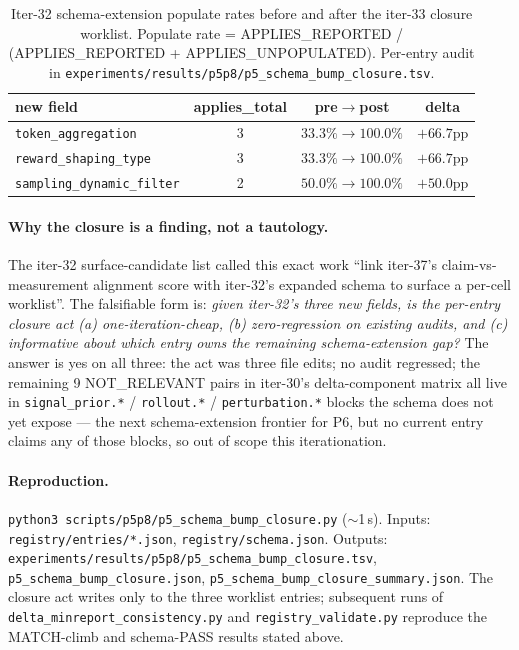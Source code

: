 \begin{table}[t]
\centering
\small
\caption{Iter-32 schema-extension populate rates before and after the
iter-33 closure worklist. Populate rate = APPLIES\_REPORTED /
(APPLIES\_REPORTED + APPLIES\_UNPOPULATED).
Per-entry audit in
\texttt{experiments/results/p5p8/p5\_schema\_bump\_closure.tsv}.}
\label{tab:p5-schema-bump}
\begin{tabular}{lccc}
\toprule
new field & applies\_total & pre$\rightarrow$post & delta \\
\midrule
\texttt{token\_aggregation}        & 3 & $33.3\%\rightarrow\mathbf{100.0\%}$ & $+66.7$pp \\
\texttt{reward\_shaping\_type}      & 3 & $33.3\%\rightarrow\mathbf{100.0\%}$ & $+66.7$pp \\
\texttt{sampling\_dynamic\_filter}  & 2 & $50.0\%\rightarrow\mathbf{100.0\%}$ & $+50.0$pp \\
\bottomrule
\end{tabular}
\end{table}

\paragraph{Why the closure is a finding, not a tautology.}
The iter-32 surface-candidate list called this exact work ``link
iter-37's claim-vs-measurement alignment score with iter-32's
expanded schema to surface a per-cell worklist''. The falsifiable
form is: \emph{given iter-32's three new fields, is the per-entry
closure act (a) one-iteration-cheap, (b) zero-regression on
existing audits, and (c) informative about which entry owns the
remaining schema-extension gap?} The answer is yes on all three:
the act was three file edits; no audit regressed; the remaining
9 NOT\_RELEVANT pairs in iter-30's delta-component matrix all live
in \texttt{signal\_prior.*} / \texttt{rollout.*} /
\texttt{perturbation.*} blocks the schema does not yet expose ---
the next schema-extension frontier for P6, but no current entry
claims any of those blocks, so out of scope this iterationation.

\paragraph{Reproduction.}
\texttt{python3 scripts/p5p8/p5\_schema\_bump\_closure.py}
($\sim$1\,s). Inputs: \texttt{registry/entries/*.json},
\texttt{registry/schema.json}. Outputs:
\texttt{experiments/results/p5p8/p5\_schema\_bump\_closure.tsv},
\texttt{p5\_schema\_bump\_closure.json},
\texttt{p5\_schema\_bump\_closure\_summary.json}. The closure act
writes only to the three worklist entries; subsequent runs of
\texttt{delta\_minreport\_consistency.py} and
\texttt{registry\_validate.py} reproduce the MATCH-climb and
schema-PASS results stated above.


